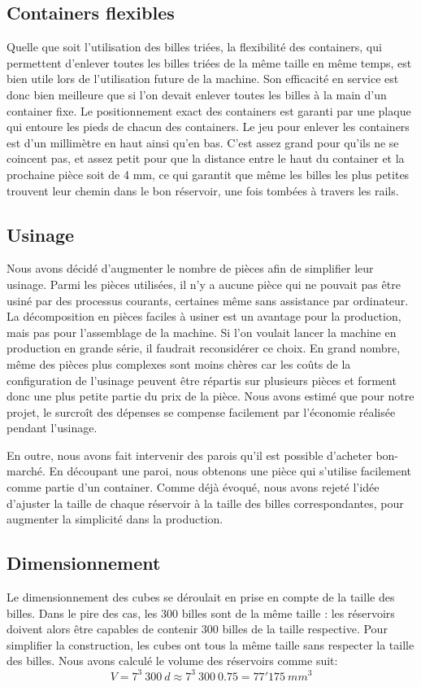 \subsection{Containers flexibles}
Quelle que soit l'utilisation des billes triées, la flexibilité des containers, qui permettent d'enlever toutes les billes triées de la même taille en même temps, est bien utile lors de l'utilisation future de la machine. Son efficacité en service est donc bien meilleure que si l'on devait enlever toutes les billes à la main d'un container fixe. Le positionnement exact des containers est garanti par une plaque %
qui entoure les pieds de chacun des containers. Le jeu pour enlever les containers est d'un millimètre en haut ainsi qu'en bas. C'est assez grand pour qu'ils ne se coincent pas, et assez petit pour que la distance entre le haut du container et la prochaine pièce soit de 4 mm, ce qui garantit que même les billes les plus petites trouvent leur chemin dans le bon réservoir, une fois tombées à travers les rails.

\subsection{Usinage}
Nous avons décidé d'augmenter le nombre de pièces afin de simplifier leur usinage. Parmi les pièces utilisées, il n'y a aucune pièce qui ne pouvait pas être usiné par des processus courants, certaines même sans assistance par ordinateur. La décomposition en pièces faciles à usiner est un avantage pour la production, mais pas pour l'assemblage de la machine. Si l'on voulait lancer la machine en production en grande série, il faudrait reconsidérer ce choix. En grand nombre, même des pièces plus complexes sont moins chères car les coûts de la configuration de l'usinage peuvent être répartis sur plusieurs pièces et forment donc une plus petite partie du prix de la pièce. Nous avons estimé que pour notre projet, le surcroît des dépenses se compense facilement par l'économie réalisée pendant l'usinage.

En outre, nous avons fait intervenir des parois qu'il est possible d'acheter bon-marché. En découpant une paroi, nous obtenons une pièce qui s'utilise facilement comme partie d'un container. Comme déjà évoqué, nous avons rejeté l'idée d'ajuster la taille de chaque réservoir à la taille des billes correspondantes, pour augmenter la simplicité dans la production. 

\subsection{Dimensionnement}
Le dimensionnement des cubes se déroulait en prise en compte de la taille des billes. Dans le pire des cas, les 300 billes sont de la même taille : les réservoirs doivent alors être capables de contenir 300 billes de la taille respective. Pour simplifier la construction, les cubes ont tous la même taille sans respecter la taille des billes.
Nous avons calculé le volume des réservoirs comme suit:
\begin{equation}
    V = 7^3\ 300\ d \approx 7^3\ 300\ 0.75 = 77'175\ mm^3
    \label{eq:volumereservoirfin}
\end{equation}

